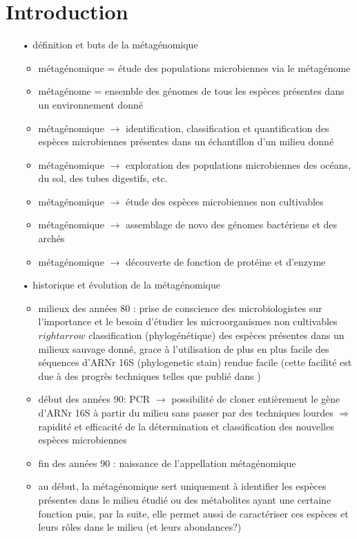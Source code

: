 \section{Introduction}

	\begin{itemize}
		
        \item[•] définition et buts de la métagénomique
          \begin{itemize}
          \item métagénomique = étude des populations microbiennes via le métagénome
          \item métagénome = ensemble des génomes de tous les espèces présentes dans un environnement donné
          \item métagénomique $\rightarrow$ identification, classification et quantification des espèces microbiennes présentes dans un échantillon d'un milieu donné
          \item métagénomique $\rightarrow$ exploration des populations microbiennes des océans, du sol, des tubes digestifs, etc.
          \item métagénomique $\rightarrow$ étude des espèces microbiennes non cultivables
          \item métagénomique $\rightarrow$ assemblage de novo des génomes bactériens et des archés
          \item métagénomique $\rightarrow$ découverte de fonction de protéine et d'enzyme
          \end{itemize}
          
        \item[•] historique et évolution de la métagénomique \cite{Handelsman2004a}
          \begin{itemize}
          \item milieux des années 80 : prise de conscience des microbiologistes sur l'importance et le besoin d'étudier les microorganismes non cultivables \cite{Torsvik1990} $rightarrow$ classification (phylogénétique) des espèces présentes dans un milieux sauvage donné, grace à l'utilisation de plus en plus facile des séquences d'ARNr 16S (phylogenetic stain) rendue facile (cette facilité est due à des progrès techniques telles que publié dans \cite{lane1985})
          \item début des années 90: PCR $\rightarrow$ possibilité de cloner entièrement le gène d'ARNr 16S à partir du milieu sans passer par des techniques lourdes $\Rightarrow$ rapidité et efficacité de la détermination et classification des nouvelles espèces microbiennes \cite{Schmidt1991}
          \item fin des années 90 : naissance de l'appellation métagénomique \cite{Handelsman1998}
          \item au début, la métagénomique sert uniquement à identifier les espèces présentes dans le milieu étudié ou des métabolites ayant une certaine fonction puis, par la suite, elle permet aussi de caractériser ces espèces et leurs rôles dans le milieu (et leurs abondances?)
          \end{itemize}
          

\end{itemize}
